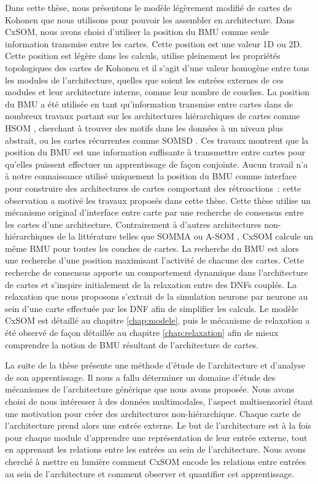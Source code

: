 Dans cette thèse, nous présentons le modèle légèrement modifié de cartes de Kohonen que nous utilisons pour pouvoir les assembler en architecture.
Dans CxSOM, nous avons choisi d'utiliser la position du BMU comme seule information transmise entre les cartes. Cette position est une valeur 1D ou 2D. Cette position est légère dans les calculs, utilise pleinement les propriétés topologiques des cartes de Kohonen et il s'agit d'une valeur homogène entre tous les modules de l'architecture, quelles que soient les entrées externes de ces modules et leur architecture interne, comme leur nombre de couches.
La position du BMU a été utilisée en tant qu'information transmise entre cartes dans de nombreux travaux portant sur les architectures hiérarchiques de cartes comme HSOM \cite{lampinen_clustering_1992}, cherchant à trouver des motifs dans les données à un niveau plus abstrait, ou les cartes récurrentes comme SOMSD \cite{hagenbuchner_self-organizing_2003}. Ces travaux montrent que la position du BMU est une information suffisante à transmettre entre cartes pour qu'elles puissent effectuer un apprentissage de façon conjointe.
Aucun travail n'a à notre connaissance utilisé uniquement la position du BMU comme interface pour construire des architectures de cartes comportant des rétroactions~: cette observation a motivé les travaux proposés dans cette thèse.
Cette thèse utilise un mécanisme original d'interface entre carte par une recherche de consensus entre les cartes d'une architecture. Contrairement à d'autres architectures non-hiérarchiques de la littérature telles que SOMMA \cite{dominey13} ou A-SOM \cite{johnsson_associating_2008}, CxSOM calcule un même BMU pour toutes les couches de cartes. 
La recherche du BMU est alors une recherche d'une position maximisant l'activité de chacune des cartes.
Cette recherche de consensus apporte un comportement dynamique dans l'architecture de cartes et s'inspire initialement de la relaxation entre des DNFs couplés. 
La relaxation que nous proposons s'extrait de la simulation neurone par neurone au sein d'une carte effectuée par les DNF afin de simplifier les calculs. 
Le modèle CxSOM est détaillé au chapitre \ref{chap:modele}, puis le mécanisme de relaxation a été observé de façon détaillée au chapitre \ref{chap:relaxation} afin de mieux comprendre la notion de BMU résultant de l'architecture de cartes.

La suite de la thèse présente une méthode d'étude de l'architecture et d'analyse de son apprentissage.
Il nous a fallu déterminer un domaine d'étude des mécanismes de l'architecture générique que nous avons proposée. Nous avons choisi de nous intéresser à des données multimodales, l'aspect multisensoriel étant une motivation pour créer des architectures non-hiérarchique. 
Chaque carte de l'architecture prend alors une entrée externe.
Le but de l'architecture est à la fois pour chaque module d'apprendre une représentation de leur entrée externe,  tout en apprenant les relations entre les entrées au sein de l'architecture. 
Nous avons cherché à mettre en lumière comment CxSOM encode les relations entre entrées au sein de l'architecture et comment observer et quantifier cet apprentissage.

